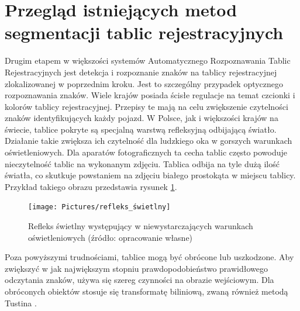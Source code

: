 \section{Przegląd istniejących metod segmentacji tablic rejestracyjnych}

Drugim etapem w większości systemów Automatycznego Rozpoznawania Tablic Rejestracyjnych jest detekcja i rozpoznanie znaków na tablicy rejestracyjnej zlokalizowanej w poprzednim kroku.
Jest to szczególny przypadek optycznego rozpoznawania znaków.
Wiele krajów posiada ścisłe regulacje na temat czcionki i kolorów tablicy rejestracyjnej.
Przepisy te mają na celu zwiększenie czytelności znaków identyfikujących każdy pojazd.
W Polsce, jak i większości krajów na świecie, tablice pokryte są specjalną warstwą refleksyjną odbijającą światło.
Działanie takie zwiększa ich czytelność dla ludzkiego oka w gorszych warunkach oświetleniowych.
Dla aparatów fotograficznych ta cecha tablic często powoduje nieczytelność tablic na wykonanym zdjęciu.
Tablica odbija na tyle dużą ilość światła, co skutkuje powstaniem na zdjęciu białego prostokąta w miejscu tablicy.
Przykład takiego obrazu przedstawia rysunek \ref{fig:refleks_swietlny}.
\begin{figure}[!ht]
    \centering
    \texttt{[image: Pictures/refleks\_świetlny]}
    \caption{Refleks świetlny występujący w niewystarczających warunkach oświetleniowych (źródło: opracowanie własne)}
    \label{fig:refleks_swietlny}
\end{figure}
\FloatBarrier
Poza powyższymi trudnościami, tablice mogą być obrócone lub uszkodzone.
Aby zwiększyć w jak największym stopniu prawdopodobieństwo prawidłowego odczytania znaków, używa się szereg czynności na obrazie wejściowym.
Dla obróconych obiektów stosuje się transformatę biliniową, zwaną również metodą Tustina \cite{Xu2006AMO}.


